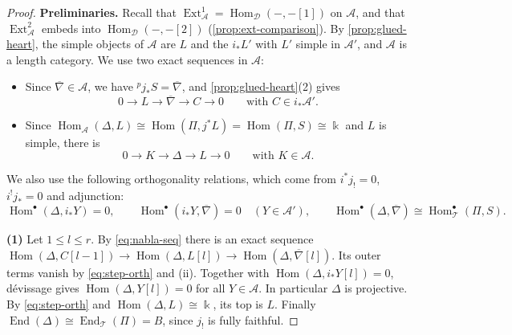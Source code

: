\documentclass[11pt,reqno]{amsart}
\theoremstyle{plain}
\theoremstyle{definition}
\theoremstyle{remark}
\newcommand{\kk}{\Bbbk}
\DeclareMathOperator{\Hom}{Hom}
\DeclareMathOperator{\End}{End}
\DeclareMathOperator{\Ext}{Ext}
\newcommand{\nablabar}{\overline{\nabla}}
\newcommand{\cD}{\mathcal{D}}
\newcommand{\cA}{\mathcal{A}}
\newcommand{\cT}{\mathcal{T}}
\begin{document}
\begin{proof}
\textbf{Preliminaries.} Recall that $\Ext^1_\cA=\Hom_\cD(-,-[1])$ on $\cA$, and that $\Ext^2_\cA$ embeds into $\Hom_\cD(-,-[2])$ (\cref{prop:ext-comparison}). By \cref{prop:glued-heart}, the simple objects of $\cA$ are $L$ and the $i_*L'$ with $L'$ simple in $\cA'$, and $\cA$ is a length category. We use two exact sequences in $\cA$:
\begin{itemize}
\item Since $\nablabar\in\cA$, we have ${}^p\!j_*S=\nablabar$, and \cref{prop:glued-heart}(2) gives
\begin{equation}\label{eq:nabla-seq}
0\to L\to\nablabar\to C\to0\qquad\text{with }C\in i_*\cA'.
\end{equation}
\item Since $\Hom_\cA(\Delta,L)\cong\Hom(\Pi,j^*L)=\Hom(\Pi,S)\cong\kk$ and $L$ is simple, there is
\begin{equation}\label{eq:delta-seq}
0\to K\to\Delta\to L\to0\qquad\text{with }K\in\cA.
\end{equation}
\end{itemize}
We also use the following orthogonality relations, which come from $i^*j_!=0$, $i^!j_*=0$ and adjunction:
\begin{equation}\label{eq:step-orth}
\Hom^\bullet(\Delta,i_*Y)=0,\qquad\Hom^\bullet(i_*Y,\nablabar)=0\quad(Y\in\cA'),\qquad\Hom^\bullet(\Delta,\nablabar)\cong\Hom^\bullet_\cT(\Pi,S).
\end{equation}

\textbf{(1)} Let $1\le l\le r$. By \eqref{eq:nabla-seq} there is an exact sequence $\Hom(\Delta,C[l-1])\to\Hom(\Delta,L[l])\to\Hom(\Delta,\nablabar[l])$. Its outer terms vanish by \eqref{eq:step-orth} and (ii). Together with $\Hom(\Delta,i_*Y[l])=0$, d\'evissage gives $\Hom(\Delta,Y[l])=0$ for all $Y\in\cA$. In particular $\Delta$ is projective. By \eqref{eq:step-orth} and $\Hom(\Delta,L)\cong\kk$, its top is $L$. Finally $\End(\Delta)\cong\End_\cT(\Pi)=B$, since $j_!$ is fully faithful.


\end{proof}
\end{document}
